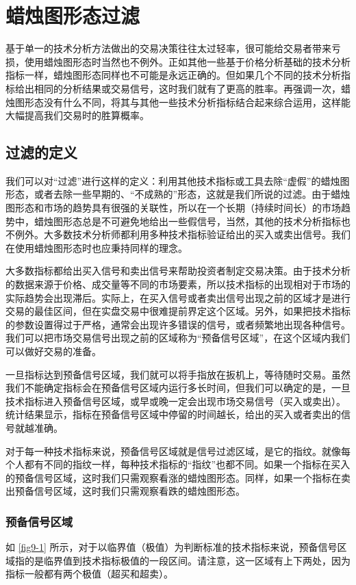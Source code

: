 \chapter{蜡烛图形态过滤}
基于单一的技术分析方法做出的交易决策往往太过轻率，很可能给交易者带来亏损，使用蜡烛图形态时当然也不例外。正如其他一些基于价格分析基础的技术分析指标一样，蜡烛图形态同样也不可能是永远正确的。但如果几个不同的技术分析指标给出相同的分析结果或交易信号，这时我们就有了更高的胜率。再强调一次，蜡烛图形态没有什么不同，将其与其他一些技术分析指标结合起来综合运用，这样能大幅提高我们交易时的胜算概率。
\section{过滤的定义}
我们可以对“过滤”进行这样的定义：利用其他技术指标或工具去除“虚假”的蜡烛图形态，或者去除一些早期的、“不成熟的”形态，这就是我们所说的过滤。由于蜡烛图形态和市场的趋势具有很强的关联性，所以在一个长期（持续时间长）的市场趋势中，蜡烛图形态总是不可避免地给出一些假信号，当然，其他的技术分析指标也不例外。大多数技术分析师都利用多种技术指标验证给出的买入或卖出信号。我们在使用蜡烛图形态时也应秉持同样的理念。

大多数指标都给出买入信号和卖出信号来帮助投资者制定交易决策。由于技术分析的数据来源于价格、成交量等不同的市场要素，所以技术指标的出现相对于市场的实际趋势会出现滞后。实际上，在买入信号或者卖出信号出现之前的区域才是进行交易的最佳区间，但在实盘交易中很难提前界定这个区域。另外，如果把技术指标的参数设置得过于严格，通常会出现许多错误的信号，或者频繁地出现各种信号。我们可以把市场交易信号出现之前的区域称为“预备信号区域”，在这个区域内我们可以做好交易的准备。

一旦指标达到预备信号区域，我们就可以将手指放在扳机上，等待随时交易。虽然我们不能确定指标会在预备信号区域内运行多长时间，但我们可以确定的是，一旦技术指标进入预备信号区域，或早或晚一定会出现市场交易信号（买入或卖出）。统计结果显示，指标在预备信号区域中停留的时间越长，给出的买入或者卖出的信号就越准确。

对于每一种技术指标来说，预备信号区域就是信号过滤区域，是它的指纹。就像每个人都有不同的指纹一样，每种技术指标的“指纹”也都不同。如果一个指标在买入的预备信号区域，这时我们只需观察看涨的蜡烛图形态。同样，如果一个指标在卖出预备信号区域，这时我们只需观察看跌的蜡烛图形态。
\subsection{预备信号区域}
如 \autoref{fig9-1} 所示，对于以临界值（极值）为判断标准的技术指标来说，预备信号区域指的是临界值到技术指标极值的一段区间。请注意，这一区域有上下两处，因为指标一般都有两个极值（超买和超卖）。

